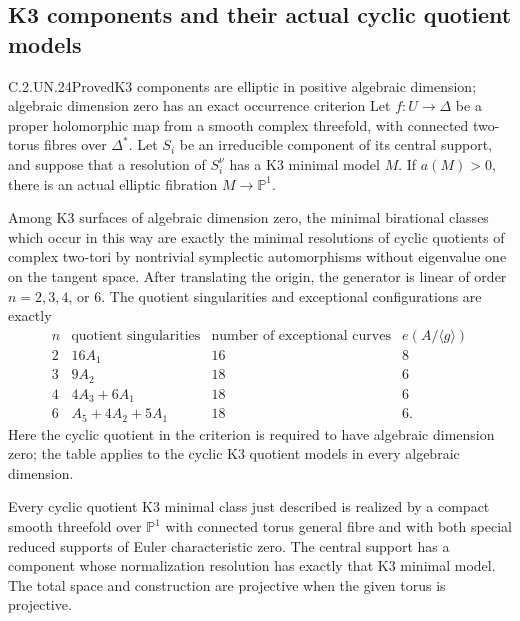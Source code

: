 \subsection{K3 components and their actual cyclic quotient models}

\begin{statement}{C.2.UN.24}{Proved}{K3 components are elliptic in positive algebraic dimension; algebraic dimension zero has an exact occurrence criterion}
Let $f:U\to\Delta$ be a proper holomorphic map from a
smooth complex threefold, with connected two-torus fibres
over $\Delta^*$. Let $S_i$ be an irreducible component of
its central support, and suppose that a resolution of
$S_i^\nu$ has a K3 minimal model $M$.
If $a(M)>0$, there is an actual elliptic fibration
$M\to\mathbb P^1$.

Among K3 surfaces of algebraic dimension zero, the minimal
birational classes which occur in this way are exactly the
minimal resolutions of cyclic quotients of complex two-tori
by nontrivial symplectic automorphisms without eigenvalue
one on the tangent space. After translating the origin, the generator
is linear of order $n=2,3,4$, or $6$. The quotient singularities
and exceptional configurations are exactly
\[
\begin{array}{c|c|c|c}
n&\text{quotient singularities}&
 \text{number of exceptional curves}&e(A/\langle g\rangle)\\ \hline
2&16A_1&16&8\\
3&9A_2&18&6\\
4&4A_3+6A_1&18&6\\
6&A_5+4A_2+5A_1&18&6.
\end{array}                                                    \tag{C.K3.1}
\]
Here the cyclic quotient in the criterion is required to
have algebraic dimension zero; the table applies to the
cyclic K3 quotient models in every algebraic dimension.

Every cyclic quotient K3 minimal class just described is
realized by a compact smooth threefold over $\mathbb P^1$
with connected torus general fibre and with both special
reduced supports of Euler characteristic zero. The central
support has a component whose normalization resolution has
exactly that K3 minimal model. The total space and construction
are projective when the given torus is projective.
\end{statement}

